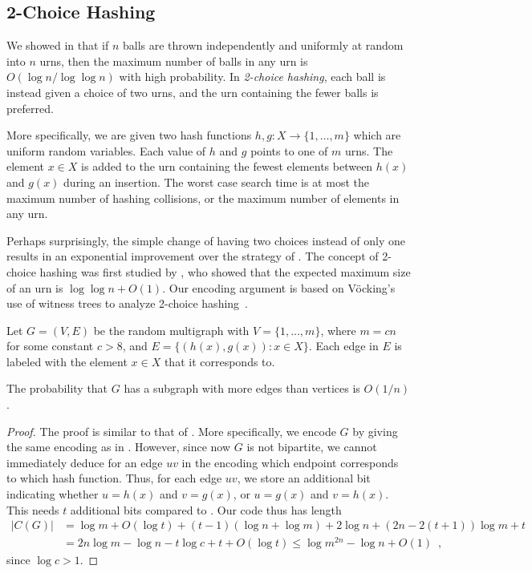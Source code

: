 \documentclass[format=acmsmall, review=false, screen=true]{acmart}
\begin{document}
\subsection{2-Choice Hashing}

We showed in  that if $n$ balls are thrown independently
and uniformly at random into $n$ urns, then the maximum number of
balls in any urn is $O(\log n/\log \log n)$ with high probability. In
\emph{2-choice hashing}, each ball is instead given a choice of two
urns, and the urn containing the fewer balls is preferred.

More specifically, we are given two hash functions $h, g : X \to \{1,
\ldots, m\}$ which are uniform random variables. Each value of $h$ and
$g$ points to one of $m$ urns. The element $x \in X$ is added to the
urn containing the fewest elements between $h(x)$ and $g(x)$ during an
insertion. The worst case search time is at most the maximum number of
hashing collisions, or the maximum number of elements in any urn.

Perhaps surprisingly, the simple change of having two choices instead
of only one results in an exponential improvement over the strategy of
. The concept of 2-choice hashing was first studied by 
, who showed that the expected
maximum size of an urn is $\log \log n + O(1)$. Our encoding argument
is based on V\"{o}cking's use of witness trees to analyze 2-choice
hashing~\cite{vocking:witness}.

Let $G = (V, E)$ be the random multigraph with $V = \{1, \ldots, m\}$,
where $m = cn$ for some constant $c > 8$, and
$E = \{(h(x), g(x)) : x \in X\}$. Each edge in $E$ is
labeled with the element $x \in X$ that it corresponds to.

\begin{lem}
  The probability that $G$ has a subgraph with more edges than 
  vertices is
  $O(1/n)$.
\end{lem}
\begin{proof}
  The proof is similar to that of . More
  specifically, we encode $G$ by giving the same encoding as in
  . However, since now $G$ is not bipartite,
  we cannot immediately deduce for an edge $uv$ in the encoding
  which endpoint corresponds to which hash function.
  Thus, for each edge $uv$, we store an additional bit indicating whether $u = h(x)$ and $v = g(x)$, or $u
  = g(x)$ and $v = h(x)$. This needs $t$ additional bits compared to . 
Our code thus has length
  \begin{align*}
    |C(G)| &= \log m + O(\log t) + (t - 1)(\log n + \log m) + 2 \log n + (2n - 2(t + 1))\log m + t  \\
           &= 2n \log m - \log n - t \log c + t + O(\log t) 
           \le \log m^{2n} - \log n + O(1) \enspace ,
  \end{align*}
  since $\log c > 1$.
\end{proof}
\end{document}
